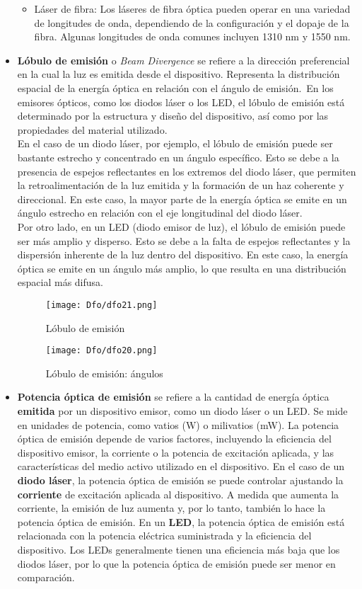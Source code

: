 \documentclass[
	12pt, %
	fleqn, %
	a4paper, %
	oneside, %
]{LegrandOrangeBook}
\begin{document}
\begin{itemize}
\begin{itemize}
\item Láser de fibra: Los láseres de fibra óptica pueden operar en una variedad de longitudes de onda, dependiendo de la configuración y el dopaje de la fibra. Algunas longitudes de onda comunes incluyen 1310 nm y 1550 nm.
\end{itemize}
\item \textbf{Lóbulo de emisión} o \textit{Beam Divergence} se refiere a la dirección preferencial en la cual la luz es emitida desde el dispositivo. Representa la distribución espacial de la energía óptica en relación con el ángulo de emisión.\
En los emisores ópticos, como los diodos láser o los LED, el lóbulo de emisión está determinado por la estructura y diseño del dispositivo, así como por las propiedades del material utilizado.\\
En el caso de un diodo láser, por ejemplo, el lóbulo de emisión puede ser bastante estrecho y concentrado en un ángulo específico. Esto se debe a la presencia de espejos reflectantes en los extremos del diodo láser, que permiten la retroalimentación de la luz emitida y la formación de un haz coherente y direccional. En este caso, la mayor parte de la energía óptica se emite en un ángulo estrecho en relación con el eje longitudinal del diodo láser.\\
Por otro lado, en un LED (diodo emisor de luz), el lóbulo de emisión puede ser más amplio y disperso. Esto se debe a la falta de espejos reflectantes y la dispersión inherente de la luz dentro del dispositivo. En este caso, la energía óptica se emite en un ángulo más amplio, lo que resulta en una distribución espacial más difusa.
\begin{figure}[H]
\centering
\texttt{[image: Dfo/dfo21.png]}
\caption{Lóbulo de emisión}
\end{figure}
\begin{figure}[H]
\centering
\texttt{[image: Dfo/dfo20.png]}
\caption{Lóbulo de emisión: ángulos}
\end{figure}
\item \textbf{Potencia óptica de emisión}  se refiere a la cantidad de energía óptica \textbf{emitida} por un dispositivo emisor, como un diodo láser o un LED. Se mide en unidades de potencia, como vatios (W) o milivatios (mW). La potencia óptica de emisión depende de varios factores, incluyendo la eficiencia del dispositivo emisor, la corriente o la potencia de excitación aplicada, y las características del medio activo utilizado en el dispositivo. En el caso de un \textbf{diodo láser}, la potencia óptica de emisión se puede controlar ajustando la \textbf{corriente} de excitación aplicada al dispositivo. A medida que aumenta la corriente, la emisión de luz aumenta y, por lo tanto, también lo hace la potencia óptica de emisión. En un \textbf{LED}, la potencia óptica de emisión está relacionada con la potencia eléctrica suministrada y la eficiencia del dispositivo. Los LEDs generalmente tienen una eficiencia más baja que los diodos láser, por lo que la potencia óptica de emisión puede ser menor en comparación.

\end{itemize}
\end{document}
